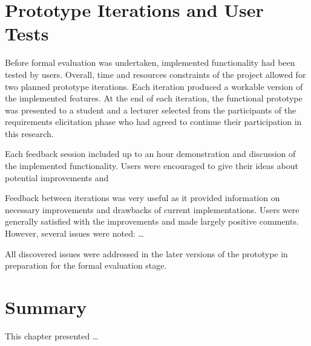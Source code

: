 \section{Prototype Iterations and User Tests}
 
Before formal evaluation was undertaken, implemented functionality had been
tested by users. Overall, time and resources constraints of the project allowed
for two planned prototype iterations. Each iteration produced a workable version
of the implemented features. At the end of each iteration, the functional
prototype was presented to a student and a lecturer selected from the
participants of the requirements elicitation phase who had agreed to continue
their participation in this research.

Each feedback session included up to an hour demonstration and discussion of the
implemented functionality. Users were encouraged to give their ideas about
potential improvements and 

Feedback between iterations was very useful as it provided information on
necessary improvements and drawbacks of current implementations. Users were
generally satisfied with the improvements and made largely positive comments.
However, several issues were noted: \ldots

All discovered issues were addressed in the later versions of the prototype
in preparation for the formal evaluation stage.

\section{Summary}

This chapter presented \ldots